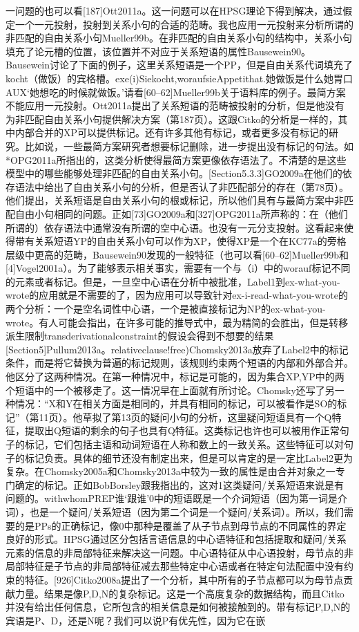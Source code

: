 一问题的也可以看[187]Ott2011a。这一问题可以在HPSG理论下得到解决，通过假定一个一元投射，投射到关系小句的合适的范畴。我也应用一元投射来分析所谓的非匹配的自由关系小句Mueller99b。在非匹配的自由关系小句的结构中，关系小句填充了论元槽的位置，该位置并不对应于关系短语的属性Bausewein90。Bausewein讨论了下面的例子，这里关系短语是一个PP，但是自由关系代词填充了kocht（做饭）的宾格槽。exe(i)Siekocht,woraufsieAppetithat.她做饭是什么她胃口AUX`她想吃的时候就做饭。'请看[60--62]Mueller99b关于语料库的例子。最简方案不能应用一元投射。Ott2011a提出了关系短语的范畴被投射的分析，但是他没有为非匹配自由关系小句提供解决方案（第187页）。这跟Citko的分析是一样的，其中内部合并的XP可以提供标记。还有许多其他有标记，或者更多没有标记的研究。比如说，一些最简方案研究者想要标记删除，进一步提出没有标记的句法。如*OPG2011a所指出的，这类分析使得最简方案更像依存语法了。不清楚的是这些模型中的哪些能够处理非匹配的自由关系小句。[Section5.3.3]GO2009a在他们的依存语法中给出了自由关系小句的分析，但是否认了非匹配部分的存在（第78页）。他们提出，关系短语是自由关系小句的根或标记，所以他们具有与最简方案中非匹配自由小句相同的问题。正如[73]GO2009a和[327]OPG2011a所声称的：在（他们所谓的）依存语法中通常没有所谓的空中心语。也没有一元分支投射。这看起来使得带有关系短语YP的自由关系小句可以作为XP，使得XP是一个在KC77a的旁格层级中更高的范畴，Bausewein90发现的一般特征（也可以看[60--62]Mueller99b和[4]Vogel2001a）。为了能够表示相关事实，需要有一个与（i）中的worauf标记不同的元素或者标记。但是，一旦空中心语在分析中被批准，Label1到ex-what-you-wrote的应用就是不需要的了，因为应用可以导致针对ex-i-read-what-you-wrote的两个分析：一个是空名词性中心语，一个是被直接标记为NP的ex-what-you-wrote。有人可能会指出，在许多可能的推导式中，最为精简的会胜出，但是转移派生限制transderivationalconstraint的假设会得到不想要的结果[Section5]Pullum2013a。relativeclause!free)Chomsky2013a放弃了Label2中的标记条件，而是将它替换为普遍的标记规则，该规则约束两个短语的内部和外部合并。他区分了这两种情况。在第一种情况中，标记是可能的，因为集合XP,YP中的两个短语中的一个被移走了。这一情况早在上面就有所讨论。Chomsky还写了另一种情况：“X和Y在相关方面是相同的，并具有相同的标记，可以被看作是SO的标记”（第11页）。他草拟了第13页的疑问小句的分析，这里疑问短语具有一个Q特征，提取出Q短语的剩余的句子也具有Q特征。这类标记也许也可以被用作正常句子的标记，它们包括主语和动词短语在人称和数上的一致关系。这些特征可以对句子的标记负责。具体的细节还没有制定出来，但是可以肯定的是一定比Label2更为复杂。在Chomsky2005a和Chomsky2013a中较为一致的属性是由合并对象之一专门确定的标记。正如BobBorsley跟我指出的，这对1这类疑问/关系短语来说是有问题的。withwhomPREP谁`跟谁'0中的短语既是一个介词短语（因为第一词是介词），也是一个疑问/关系短语（因为第二个词是一个疑问/关系词）。所以，我们需要的是PPs的正确标记，像0中那种是覆盖了从子节点到母节点的不同属性的界定良好的形式。HPSG通过区分包括言语信息的中心语特征和包括提取和疑问/关系元素的信息的非局部特征来解决这一问题。中心语特征从中心语投射，母节点的非局部特征是子节点的非局部特征减去那些特定中心语或者在特定句法配置中没有约束的特征。[926]Citko2008a提出了一个分析，其中所有的子节点都可以为母节点贡献力量。结果是像P,D,N的复杂标记。这是一个高度复杂的数据结构，而且Citko并没有给出任何信息，它所包含的相关信息是如何被接触到的。带有标记P,D,N的宾语是P、D，还是N呢？我们可以说P有优先性，因为它在嵌
